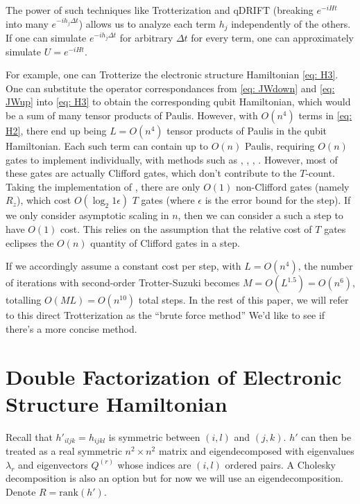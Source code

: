 The power of such techniques like Trotterization and qDRIFT (breaking $e^{-iHt}$ into many $e^{-ih_j\Delta t}$) allows us to analyze each term $h_j$ independently of the others. If one can simulate $e^{-ih_j \Delta t}$ for arbitrary $\Delta t$ for every term, one can approximately simulate $U = e^{-iHt}$.

For example, one can Trotterize the electronic structure Hamiltonian \eqref{eq: H3}. One can substitute the operator correspondances from \eqref{eq: JWdown} and \eqref{eq: JWup} into \eqref{eq: H3} to obtain the corresponding qubit Hamiltonian, which would be a sum of many tensor products of Paulis. However, with $O(n^4)$ terms in \eqref{eq: H2}, there end up being $L = O(n^4)$ tensor products of Paulis in the qubit Hamiltonian. Each such term can contain up to $O(n)$ Paulis, requiring $O(n)$ gates to implement individually, with methods such as \cite{Amortize1}, \cite{Amortize2}, \cite{Amortize3}, \cite{Amortize4}. However, most of these gates are actually Clifford gates, which don't contribute to the $T$-count. Taking the implementation of \cite{Amortize4}, there are only $O(1)$ non-Clifford gates (namely $R_z$), which cost $O(\log_2{1}{\epsilon})$ $T$ gates (where $\epsilon$ is the error bound for the step). If we only consider asymptotic scaling in $n$, then we can consider a such a step to have $O(1)$ cost. This relies on the assumption that the relative cost of $T$ gates eclipses the $O(n)$ quantity of Clifford gates in a step.

If we accordingly assume a constant cost per step, with $L = O(n^4)$, the number of iterations with second-order Trotter-Suzuki becomes $M = O(L^{1.5}) = O(n^6)$, totalling $O(ML) = O(n^{10})$ total steps. In the rest of this paper, we will refer to this direct Trotterization as the ``brute force method'' We'd like to see if there's a more concise method.

\section{Double Factorization of Electronic Structure Hamiltonian}

Recall that $h'_{iljk} = h_{ijkl}$ is symmetric between $(i, l)$ and $(j, k)$. $h'$ can then be treated as a real symmetric $n^2 \times n^2$ matrix and eigendecomposed with eigenvalues $\lambda_r$ and eigenvectors $Q^{(r)}$ whose indices are $(i, l)$ ordered pairs. A Cholesky decomposition is also an option but for now we will use an eigendecomposition. Denote $R = \text{rank}{(h')}$.

